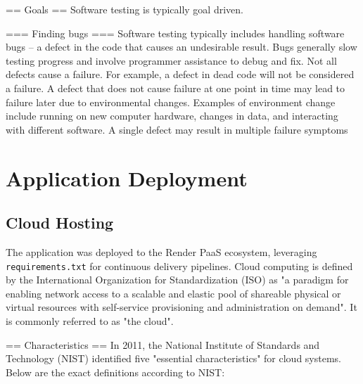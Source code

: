 \documentclass[12pt,a4paper]{report}
\begin{document}
== Goals ==
Software testing is typically goal driven.


=== Finding bugs ===
Software testing typically includes handling software bugs – a defect in the code that causes an undesirable result. Bugs generally slow testing progress and involve programmer assistance to debug and fix.
Not all defects cause a failure. For example, a defect in dead code will not be considered a failure.
A defect that does not cause failure at one point in time may lead to failure later due to environmental changes. Examples of environment change include running on new computer hardware, changes in data, and interacting with different software.
A single defect may result in multiple failure symptoms



\section{Application Deployment}
\subsection{Cloud Hosting}
The application was deployed to the Render PaaS ecosystem, leveraging \texttt{requirements.txt} for continuous delivery pipelines.
Cloud computing is defined by the International Organization for Standardization (ISO) as "a paradigm for enabling network access to a scalable and elastic pool of shareable physical or virtual resources with self-service provisioning and administration on demand". It is commonly referred to as "the cloud".


== Characteristics ==
In 2011, the National Institute of Standards and Technology (NIST) identified five "essential characteristics" for cloud systems. Below are the exact definitions according to NIST:
\end{document}

